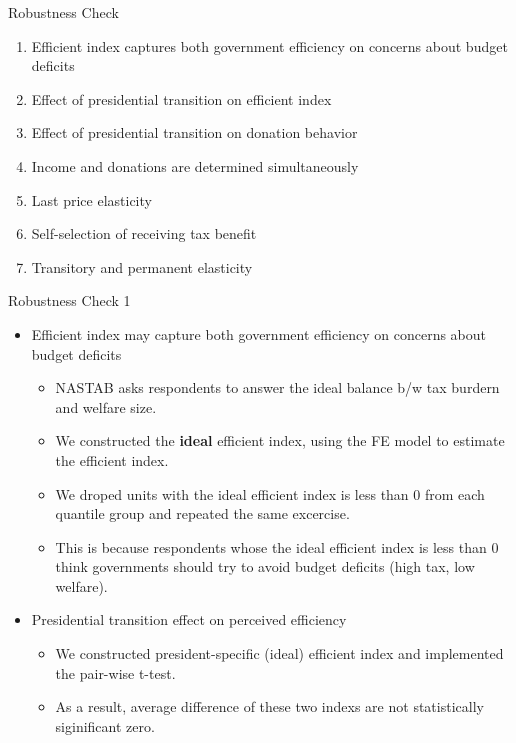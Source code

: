 \documentclass[
  ignorenonframetext,
]{beamer}
\providecommand{\tightlist}{%
  \setlength{\itemsep}{0pt}\setlength{\parskip}{0pt}}
\begin{document}
\begin{frame}{Robustness Check}
\protect\hypertarget{robustness-check-3}{}
\begin{enumerate}
\tightlist
\item
  Efficient index captures both government efficiency on concerns about budget deficits
\item
  Effect of presidential transition on efficient index
\item
  Effect of presidential transition on donation behavior
\item
  Income and donations are determined simultaneously
\item
  Last price elasticity
\item
  Self-selection of receiving tax benefit
\item
  Transitory and permanent elasticity
\end{enumerate}
\end{frame}

\begin{frame}{Robustness Check 1}
\protect\hypertarget{robustness-check-1-1}{}
\begin{itemize}
\tightlist
\item
  Efficient index may capture both government efficiency on concerns about budget deficits

  \begin{itemize}
  \tightlist
  \item
    NASTAB asks respondents to answer the ideal balance b/w tax burdern and welfare size.
  \item
    We constructed the \textbf{ideal} efficient index, using the FE model to estimate the efficient index.
  \item
    We droped units with the ideal efficient index is less than 0 from each quantile group and repeated the same excercise.
  \item
    This is because respondents whose the ideal efficient index is less than 0 think governments should try to avoid budget deficits (high tax, low welfare).
  \end{itemize}
\item
  Presidential transition effect on perceived efficiency

  \begin{itemize}
  \tightlist
  \item
    We constructed president-specific (ideal) efficient index and implemented the pair-wise t-test.
  \item
    As a result, average difference of these two indexs are not statistically siginificant zero.
  \end{itemize}
\end{itemize}
\end{frame}
\end{document}
